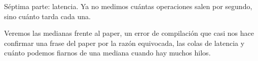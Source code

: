 Séptima parte: latencia. Ya no medimos cuántas operaciones salen por segundo, sino cuánto tarda cada una.

Veremos las medianas frente al paper, un error de compilación que casi nos hace confirmar una frase del paper por la razón equivocada, las colas de latencia y cuánto podemos fiarnos de una mediana cuando hay muchos hilos.
